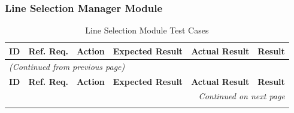\documentclass[12pt, titlepage]{article}
\begin{document}
\subsubsection{Line Selection Manager Module}
\begin{longtable}{c
    >{\raggedright\arraybackslash}p{1.5cm}
    >{\raggedright\arraybackslash}p{4.5cm}
    >{\raggedright\arraybackslash}p{4cm}
  >{\raggedright\arraybackslash}p{3cm} c}
  \toprule
  \textbf{ID} & \textbf{Ref. Req.} & \textbf{Action} &
  \textbf{Expected Result} & \textbf{Actual Result} & \textbf{Result} \\
  \midrule
  \endfirsthead

  \multicolumn{6}{l}{\textit{(Continued from previous page)}} \\
  \toprule
  \textbf{ID} & \textbf{Ref. Req.} & \textbf{Action} &
  \textbf{Expected Result} & \textbf{Actual Result} & \textbf{Result} \\
  \midrule
  \endhead

  \multicolumn{6}{r}{\textit{Continued on next page}} \\
  \endfoot

  \bottomrule
  \caption{Line Selection Module Test Cases}
  \label{table:line_selection_tests}
  \endlastfoot


\end{longtable}
\end{document}
